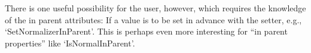 There is one useful possibility for the user, however, which requires the
knowledge of the in parent attributes: If a value is to be set in advance
with the setter, e.g., `SetNormalizerInParent'. This is perhaps even more
interesting for ``in parent properties'' like `IsNormalInParent'.

